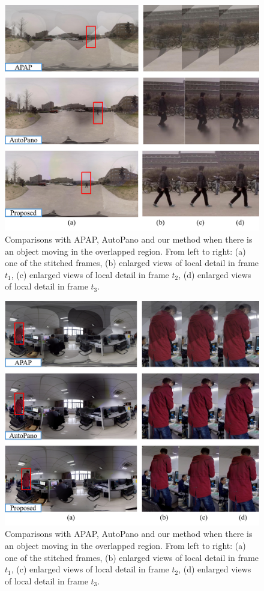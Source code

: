 \documentclass[conference]{IEEEtran}
\begin{document}


\begin{figure}[!htpb]
\centering
\includegraphics[scale=0.38]{picture37.png}
\caption{Comparisons with APAP, AutoPano and our method when there is an object moving in the overlapped region. From left to right: (a) one of the stitched frames, (b) enlarged views of local
detail in frame $t_1$, (c) enlarged views of local detail in frame $t_2$, (d) enlarged views of local detail in frame $t_3$.}
\label{fig:more1}
\end{figure}
\begin{figure}[!htpb]
\centering
\includegraphics[scale=0.38]{picture38.png}
\caption{Comparisons with APAP, AutoPano and our method when there is an object moving in the overlapped region. From left to right: (a) one of the stitched frames, (b) enlarged views of local
detail in frame $t_1$, (c) enlarged views of local detail in frame $t_2$, (d) enlarged views of local detail in frame $t_3$.}
\label{fig:more2}
\end{figure}
\end{document}

